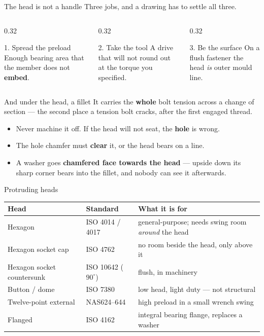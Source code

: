 \documentclass[aspectratio=169,10pt]{beamer}
\begin{document}
\begin{frame}{The head is not a handle}
Three jobs, and a drawing has to settle all three.
\vfill
\begin{columns}[T]
\begin{column}{0.32\textwidth}
\begin{block}{1. Spread the preload}
Enough bearing area that the member does not \textbf{embed}.
\end{block}
\end{column}
\begin{column}{0.32\textwidth}
\begin{block}{2. Take the tool}
A drive that will not round out at the torque you specified.
\end{block}
\end{column}
\begin{column}{0.32\textwidth}
\begin{block}{3. Be the surface}
On a flush fastener the head \emph{is} outer mould line.
\end{block}
\end{column}
\end{columns}
\vfill
\begin{alertblock}{And under the head, a fillet}
It carries the \textbf{whole} bolt tension across a change of section --- the second place a
tension bolt cracks, after the first engaged thread.
\begin{itemize}
\item Never machine it off. If the head will not seat, the \textbf{hole} is wrong.
\item The hole chamfer must \textbf{clear} it, or the head bears on a line.
\item A washer goes \textbf{chamfered face towards the head} --- upside down its sharp corner bears into the fillet, and nobody can see it afterwards.
\end{itemize}
\end{alertblock}
\end{frame}

\begin{frame}{Protruding heads}
\centering
\resizebox{!}{3.4cm}{}
\vfill
\raggedright\footnotesize
\begin{tabular}{@{}lll@{}}
\toprule
Head & Standard & What it is for\\
\midrule
Hexagon & ISO 4014 / 4017 & general-purpose; needs swing room \emph{around} the head\\
Hexagon socket cap & ISO 4762 & no room beside the head, only above it\\
Hexagon socket countersunk & ISO 10642 ($90^\circ$) & flush, in machinery\\
Button / dome & ISO 7380 & low head, light duty --- not structural\\
Twelve-point external & NAS624--644 & high preload in a small wrench swing\\
Flanged & ISO 4162 & integral bearing flange, replaces a washer\\
\bottomrule
\end{tabular}
\end{frame}
\end{document}

